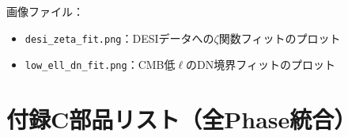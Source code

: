 \noindent
画像ファイル：
\begin{itemize}
\item \texttt{desi\_zeta\_fit.png}：DESIデータへの$\zeta$関数フィットのプロット
\item \texttt{low\_ell\_dn\_fit.png}：CMB低$\ell$のDN境界フィットのプロット
\end{itemize}



\section{付録C\quad 部品リスト（全Phase統合）}
\label{app:parts}

